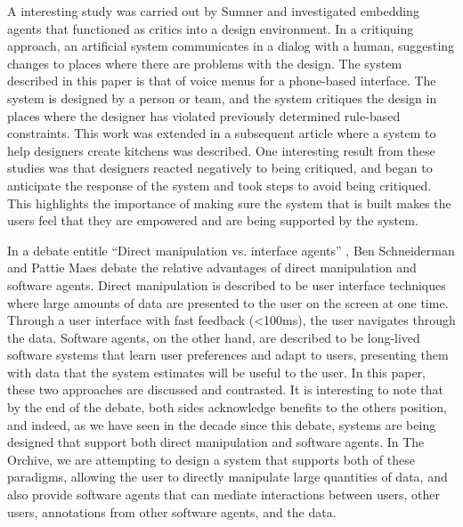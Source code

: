 \documentclass[12pt,oneside]{book}
\begin{document}
A interesting study was carried out by Sumner \cite{sumner97} and
investigated embedding agents that functioned as critics into a design
environment.  In a critiquing approach, an artificial system
communicates in a dialog with a human, suggesting changes to places
where there are problems with the design.  The system described in
this paper is that of voice menus for a phone-based interface.  The
system is designed by a person or team, and the system critiques the
design in places where the designer has violated previously determined
rule-based constraints.  This work was extended in a subsequent
article \cite{fischer98a} where a system to help designers create
kitchens was described.  One interesting result from these studies was
that designers reacted negatively to being critiqued, and began to
anticipate the response of the system and took steps to avoid being
critiqued.  This highlights the importance of making sure the system
that is built makes the users feel that they are empowered and are
being supported by the system.

In a debate entitle ``Direct manipulation vs. interface agents''
\cite{schneiderman97}, Ben Schneiderman and Pattie Maes debate the
relative advantages of direct manipulation and software agents.
Direct manipulation is described to be user interface techniques where
large amounts of data are presented to the user on the screen at one
time.  Through a user interface with fast feedback (<100ms), the user
navigates through the data.  Software agents, on the other hand, are
described to be long-lived software systems that learn user
preferences and adapt to users, presenting them with data that the
system estimates will be useful to the user.  In this paper, these two
approaches are discussed and contrasted.  It is interesting to note
that by the end of the debate, both sides acknowledge benefits to the
others position, and indeed, as we have seen in the decade since this
debate, systems are being designed that support both direct
manipulation and software agents.  In The Orchive, we are attempting
to design a system that supports both of these paradigms, allowing the
user to directly manipulate large quantities of data, and also provide
software agents that can mediate interactions between users, other
users, annotations from other software agents, and the data.
\end{document}
